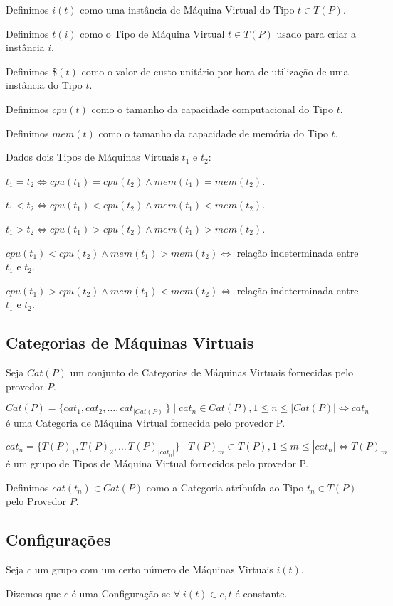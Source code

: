 Definimos $i(t)$ como uma instância de Máquina Virtual do Tipo $t \in T(P)$. 

Definimos $t(i)$ como o Tipo de Máquina Virtual $t \in T(P)$ usado para criar a 
instância $i$.

Definimos \$$(t)$ como o valor de custo unitário por hora de utilização de uma 
instância do Tipo $t$.

Definimos $cpu(t)$ como o tamanho da capacidade computacional do Tipo $t$.

Definimos $mem(t)$ como o tamanho da capacidade de memória do Tipo $t$.

Dados dois Tipos de Máquinas Virtuais $t_1$ e $t_2$:

$t_1 = t_2 \iff cpu(t_1) = cpu(t_2) \land mem(t_1) = mem(t_2)$.

$t_1 < t_2 \iff cpu(t_1) < cpu(t_2) \land mem(t_1) < mem(t_2)$.

$t_1 > t_2 \iff cpu(t_1) > cpu(t_2) \land mem(t_1) > mem(t_2)$.

$cpu(t_1) < cpu(t_2) \land mem(t_1) > mem(t_2) \iff$ relação indeterminada entre $t_1$ e $t_2$.

$cpu(t_1) > cpu(t_2) \land mem(t_1) < mem(t_2) \iff$ relação indeterminada entre $t_1$ e $t_2$.

\subsection{Categorias de Máquinas Virtuais}
Seja $Cat(P)$ um conjunto de Categorias de Máquinas Virtuais fornecidas pelo 
provedor $P$.

$Cat(P) = \{cat_1, cat_2, \dotsc, cat_{|Cat(P)|}\}\; | \; cat_n \in Cat(P), 
1 \leq n \leq |Cat(P)| \iff cat_n $ é uma Categoria de Máquina Virtual fornecida 
pelo provedor P.

$cat_n = \{T(P)_1, T(P)_2, \dotsc\, T(P)_{|cat_n|}\}\; | \; T(P)_m \subset T(P), 
1 \leq m \leq |cat_n| \iff T(P)_m $ é um grupo de Tipos de Máquina Virtual
fornecidos pelo provedor P.

Definimos $cat(t_n) \in Cat(P)$ como a Categoria atribuída ao Tipo $t_n \in T(P)$ 
pelo Provedor $P$.

\subsection{Configurações}
Seja $c$ um grupo com um certo número de Máquinas Virtuais $i(t)$.

Dizemos que $c$ é uma Configuração se $\forall \; i(t) \in c, t$ é constante.

